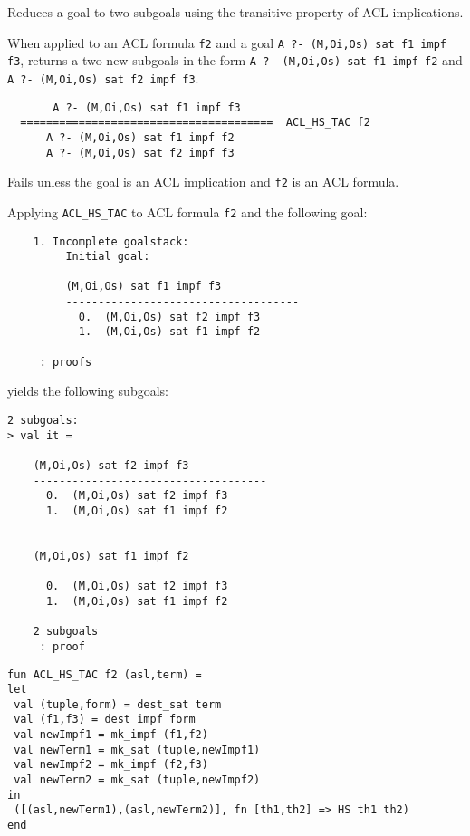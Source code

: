 \SYNOPSIS
Reduces a goal to two subgoals using the transitive property of ACL implications.

\DESCRIBE When applied to an ACL formula \texttt{f2} and a goal \texttt{A ?- (M,Oi,Os) sat f1 impf f3}, returns a two new subgoals in the form \texttt{A ?- (M,Oi,Os) sat f1 impf f2} and \texttt{A ?- (M,Oi,Os) sat f2 impf f3}.
\begin{verbatim}
       A ?- (M,Oi,Os) sat f1 impf f3
  =======================================  ACL_HS_TAC f2
      A ?- (M,Oi,Os) sat f1 impf f2     
      A ?- (M,Oi,Os) sat f2 impf f3
\end{verbatim}

\FAILURE 
Fails unless the goal is an ACL implication and \texttt{f2} is an ACL formula.

\EXAMPLE
Applying \texttt{ACL\_HS\_TAC} to ACL formula \texttt{f2} and the following goal:
\begin{holboxed}
\begin{verbatim}
    1. Incomplete goalstack:
         Initial goal:
    
         (M,Oi,Os) sat f1 impf f3
         ------------------------------------
           0.  (M,Oi,Os) sat f2 impf f3
           1.  (M,Oi,Os) sat f1 impf f2
    
     : proofs
\end{verbatim}
\end{holboxed}
yields the following subgoals:
\begin{holboxed}
\begin{verbatim}
2 subgoals:
> val it =
    
    (M,Oi,Os) sat f2 impf f3
    ------------------------------------
      0.  (M,Oi,Os) sat f2 impf f3
      1.  (M,Oi,Os) sat f1 impf f2
    
    
    (M,Oi,Os) sat f1 impf f2
    ------------------------------------
      0.  (M,Oi,Os) sat f2 impf f3
      1.  (M,Oi,Os) sat f1 impf f2
    
    2 subgoals
     : proof
\end{verbatim}
\end{holboxed}

\IMPLEMENTATION
\begin{holboxed}
\begin{verbatim}
fun ACL_HS_TAC f2 (asl,term) =
let
 val (tuple,form) = dest_sat term
 val (f1,f3) = dest_impf form
 val newImpf1 = mk_impf (f1,f2)
 val newTerm1 = mk_sat (tuple,newImpf1)
 val newImpf2 = mk_impf (f2,f3)
 val newTerm2 = mk_sat (tuple,newImpf2)
in
 ([(asl,newTerm1),(asl,newTerm2)], fn [th1,th2] => HS th1 th2)
end
\end{verbatim}
\end{holboxed}


